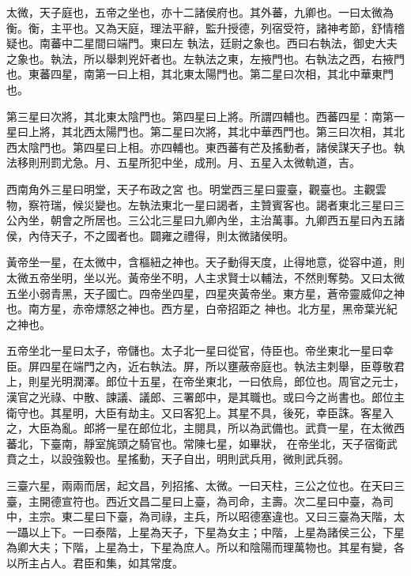 \begin{pinyinscope}
 太微，天子庭也，五帝之坐也，亦十二諸侯府也。其外蕃，九卿也。一曰太微為衡。衡，主平也。又為天庭，理法平辭，監升授德，列宿受符，諸神考節，舒情稽疑也。南蕃中二星間曰端門。東曰左
 執法，廷尉之象也。西曰右執法，御史大夫之象也。執法，所以舉刺兇奸者也。左執法之東，左掖門也。右執法之西，右掖門也。東蕃四星，南第一曰上相，其北東太陽門也。第二星曰次相，其北中華東門也。



 第三星曰次將，其北東太陰門也。第四星曰上將。所謂四輔也。西蕃四星：南第一星曰上將，其北西太陽門也。第二星曰次將，其北中華西門也。第三曰次相，其北西太陰門也。第四星曰上相。亦四輔也。東西蕃有芒及搖動者，諸侯謀天子也。執法移則刑罰尤急。月、五星所犯中坐，成刑。月、五星入太微軌道，吉。



 西南角外三星曰明堂，天子布政之宮
 也。明堂西三星曰靈臺，觀臺也。主觀雲物，察符瑞，候災變也。左執法東北一星曰謁者，主贊賓客也。謁者東北三星曰三公內坐，朝會之所居也。三公北三星曰九卿內坐，主治萬事。九卿西五星曰內五諸侯，內侍天子，不之國者也。闢雍之禮得，則太微諸侯明。



 黃帝坐一星，在太微中，含樞紐之神也。天子動得天度，止得地意，從容中道，則太微五帝坐明，坐以光。黃帝坐不明，人主求賢士以輔法，不然則奪勢。又曰太微五坐小弱青黑，天子國亡。四帝坐四星，四星夾黃帝坐。東方星，蒼帝靈威仰之神也。南方星，赤帝熛怒之神也。西方星，白帝招距之
 神也。北方星，黑帝葉光紀之神也。



 五帝坐北一星曰太子，帝儲也。太子北一星曰從官，侍臣也。帝坐東北一星曰幸臣。屏四星在端門之內，近右執法。屏，所以壅蔽帝庭也。執法主刺舉，臣尊敬君上，則星光明潤澤。郎位十五星，在帝坐東北，一曰依烏，郎位也。周官之元士，漢官之光祿、中散、諫議、議郎、三署郎中，是其職也。或曰今之尚書也。郎位主衛守也。其星明，大臣有劫主。又曰客犯上。其星不具，後死，幸臣誅。客星入之，大臣為亂。郎將一星在郎位北，主閱具，所以為武備也。武賁一星，在太微西蕃北，下臺南，靜室旄頭之騎官也。常陳七星，如畢狀，
 在帝坐北，天子宿衛武賁之土，以設強毅也。星搖動，天子自出，明則武兵用，微則武兵弱。



 三臺六星，兩兩而居，起文昌，列招搖、太微。一曰天柱，三公之位也。在天曰三臺，主開德宣符也。西近文昌二星曰上臺，為司命，主壽。次二星曰中臺，為司中，主宗。東二星曰下臺，為司祿，主兵，所以昭德塞違也。又曰三臺為天階，太一躡以上下。一曰泰階，上星為天子，下星為女主；中階，上星為諸侯三公，下星為卿大夫；下階，上星為士，下星為庶人。所以和陰陽而理萬物也。其星有變，各以所主占人。君臣和集，如其常度。




\end{pinyinscope}
